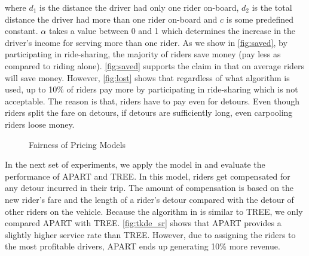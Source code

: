\noindent where $d_1$ is the distance the driver had only one rider on-board, $d_2$ is the total distance the driver had more than one rider on-board and $c$ is some predefined constant. $\alpha$ takes a value between 0 and 1 which determines the increase in the driver's income for serving more than one rider. As we show in \cref{fig:saved}, by participating in ride-sharing, the majority of riders save money (pay less as compared to riding alone). \cref{fig:saved} supports the claim in \cite{Ma13} that on average riders will save money. However, \cref{fig:lost} shows that regardless of what algorithm is used, up to 10\% of riders pay more by participating in ride-sharing which is not acceptable. The reason is that, riders have to pay even for detours. Even though riders split the fare on detours, if detours are sufficiently long, even carpooling riders loose money.

\begin{figure}[h!]
	\centering
    \vspace{-0.15in}
    \caption{Fairness of Pricing Models}
    \label{fig:fairness}
\end{figure}

In the next set of experiments, we apply the model in \cite{Ma15} and evaluate the performance of APART and TREE. In this model, riders get compensated for any detour incurred in their trip. The amount of compensation is based on the new rider's fare and the length of a rider's detour compared with the detour of other riders on the vehicle. Because the algorithm in \cite{Ma15} is similar to TREE, we only compared APART with TREE. \cref{fig:tkde_sr} shows that APART provides a slightly higher service rate than TREE. However, due to assigning the riders to the most profitable drivers, APART ends up generating 10\% more revenue.

